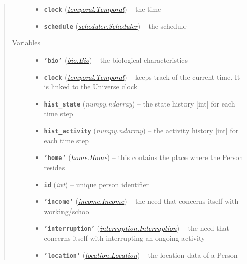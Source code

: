 \documentclass[letterpaper,10pt,english]{sphinxmanual}
\begin{document}
\begin{fulllineitems}
\begin{quote}
\begin{description}
\begin{itemize}
\item {} 
\textbf{\texttt{clock}} ({\hyperref[temporal:temporal.Temporal]{\emph{\emph{temporal.Temporal}}}}) -- the time

\item {} 
\textbf{\texttt{schedule}} ({\hyperref[scheduler:scheduler.Scheduler]{\emph{\emph{scheduler.Scheduler}}}}) -- the schedule

\end{itemize}

\item[{Variables}] \leavevmode\begin{itemize}
\item {} 
\textbf{\texttt{'bio'}} ({\hyperref[bio:bio.Bio]{\emph{\emph{bio.Bio}}}}) -- the biological characteristics

\item {} 
\textbf{\texttt{clock}} ({\hyperref[temporal:temporal.Temporal]{\emph{\emph{temporal.Temporal}}}}) -- keeps track of the current time. It is linked to the Universe clock

\item {} 
\textbf{\texttt{hist\_state}} (\emph{numpy.ndarray}) -- the state history {[}int{]} for each time step

\item {} 
\textbf{\texttt{hist\_activity}} (\emph{numpy.ndarray}) -- the activity history {[}int{]} for each time step

\item {} 
\textbf{\texttt{'home'}} ({\hyperref[home:home.Home]{\emph{\emph{home.Home}}}}) -- this contains the place where the Person resides

\item {} 
\textbf{\texttt{id}} (\emph{int}) -- unique person identifier

\item {} 
\textbf{\texttt{'income'}} ({\hyperref[income:income.Income]{\emph{\emph{income.Income}}}}) -- the need that concerns itself with working/school

\item {} 
\textbf{\texttt{'interruption'}} ({\hyperref[interruption:interruption.Interruption]{\emph{\emph{interruption.Interruption}}}}) -- the need that concerns itself with interrupting an ongoing activity

\item {} 
\textbf{\texttt{'location'}} ({\hyperref[location:location.Location]{\emph{\emph{location.Location}}}}) -- the location data of a Person


\end{itemize}
\end{description}
\end{quote}
\end{fulllineitems}
\end{document}
